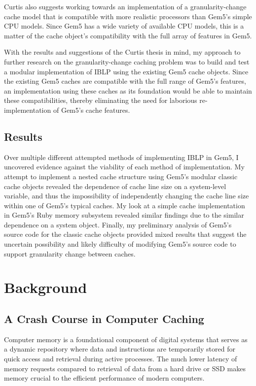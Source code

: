 \documentclass[12pt,twoside]{reedthesis}
\begin{document}
	Curtis also suggests working towards an implementation of a granularity-change cache model that is compatible with more realistic processors than Gem5's simple CPU models. Since Gem5 has a wide variety of available CPU models, this is a matter of the cache object's compatibility with the full array of features in Gem5.

	With the results and suggestions of the Curtis thesis in mind, my approach to further research on the granularity-change caching problem was to build and test a modular implementation of IBLP using the existing Gem5 cache objects. Since the existing Gem5 caches are compatible with the full range of Gem5's features, an implementation using these caches as its foundation would be able to maintain these compatibilities, thereby eliminating the need for laborious re-implementation of Gem5's cache features.

\section{Results}

Over multiple different attempted methods of implementing IBLP in Gem5, I uncovered evidence against the viability of each method of implementation. My attempt to implement a nested cache structure using Gem5's modular classic cache objects revealed the dependence of cache line size on a system-level variable, and thus the impossibility of independently changing the cache line size within one of Gem5's typical caches. My look at a simple cache implementation in Gem5's Ruby memory subsystem revealed similar findings due to the similar dependence on a system object. Finally, my preliminary analysis of Gem5's source code for the classic cache objects provided mixed results that suggest the uncertain possibility and likely difficulty of modifying Gem5's source code to support granularity change between caches.

\chapter{Background}

\section{A Crash Course in Computer Caching}

Computer memory is a foundational component of digital systems that serves as a dynamic repository where data and instructions are temporarily stored for quick access and retrieval during active processes. The much lower latency of memory requests compared to retrieval of data from a hard drive or SSD makes memory crucial to the efficient performance of modern computers.
\end{document}
